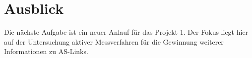 \section{Ausblick}\label{sec:ausblick}
Die nächste Aufgabe ist ein neuer Anlauf für das Projekt 1.
Der Fokus liegt hier auf der Untersuchung aktiver Messverfahren für die Gewinnung weiterer Informationen zu AS-Links.


